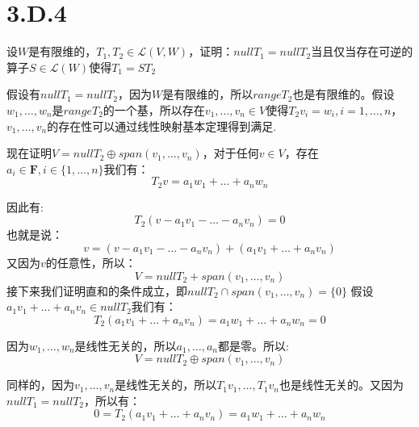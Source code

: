 \documentclass[10pt,a4paper,UTF8]{article}
\begin{document}
\section{3.D.4}
\label{sec:org0b0a1a3}


\begin{problem}
设\(W\)是有限维的，\(T_{1},T_{2}\in \mathcal{L}(V,W)\)，证明：\(nullT_{1} = nullT_{2}\)当且仅当存在可逆的算子\(S\in \mathcal{L}(W)\)使得\(T_{1} = ST_{2}\)
\end{problem}

\begin{answer}
假设有\(nullT_{1} = nullT_{2}\)，因为\(W\)是有限维的，所以\(rangeT_{2}\)也是有限维的。假设\(w_{1},\ldots ,w_{n}\)是\(rangeT_{2}\)的一个基，所以存在\(v_{1},\ldots ,v_{n}\in V\)使得\(T_{2}v_{i} = w_{i},i=1,\ldots ,n\)，\(v_{1},\ldots ,v_{n}\)的存在性可以通过线性映射基本定理得到满足.

现在证明\(V = nullT_{2}\oplus span(v_{1},\ldots ,v_{n})\)，对于任何\(v\in V\)，存在\(a_{i}\in \mathbf{F},i \in \{1,\ldots ,n\}\)我们有：
\begin{equation}
\label{eq:3}
T_{2}v = a_{1}w_{1} + \ldots + a_{n}w_{n}
\end{equation}

因此有:
\begin{equation}
\label{eq:4}
T_{2}(v-a_{1}v_{1} -\ldots -a_{n}v_{n}) = 0
\end{equation}
也就是说：
\[v = (v-a_{1}v_{1} -\ldots -a_{n}v_{n})  + (a_{1}v_{1} + \ldots + a_{n}v_{n})\]
又因为\(v\)的任意性，所以：
\begin{equation}
\label{eq:5}
V = nullT_{2} + span(v_{1},\ldots ,v_{n})
\end{equation}
接下来我们证明直和的条件成立，即\(nullT_{2}\cap span(v_{1},\ldots ,v_{n}) = \{0\}\) 假设\(a_{1}v_{1} + \ldots + a_{n}v_{n} \in nullT_{2}\)我们有：
\begin{equation}
\label{eq:6}
T_{2}(a_{1}v_{1} + \ldots + a_{n}v_{n}) = a_{1}w_{1} +\ldots + a_{n}w_{n} = 0
\end{equation}

因为\(w_{1},\ldots ,w_{n}\)是线性无关的，所以\(a_{1},\ldots ,a_{n}\)都是零。所以:
\begin{equation}
\label{eq:7}
V = nullT_{2} \oplus  span(v_{1},\ldots ,v_{n})
\end{equation}

同样的，因为\(v_{1},\ldots ,v_{n}\)是线性无关的，所以\(T_{1}v_{1},\ldots ,T_{1}v_{n}\)也是线性无关的。又因为\(nullT_{1} = nullT_{2}\)，所以有：
\begin{equation}
\label{eq:8}
0 = T_{2}(a_{1}v_{1} + \ldots + a_{n}v_{n}) = a_{1}w_{1} + \ldots +a_{n}w_{n}
\end{equation}


\end{answer}
\end{document}
